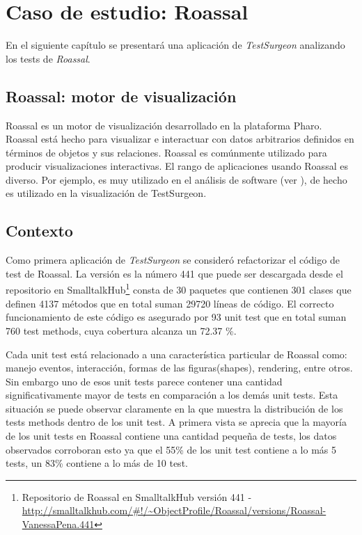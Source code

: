 \chapter{Caso de estudio: Roassal}

\par En el siguiente capítulo se presentará una aplicación de \emph{TestSurgeon} analizando los tests de \emph{Roassal}. 

\section{Roassal: motor de visualización}

\par Roassal es un motor de visualización desarrollado en la plataforma Pharo. Roassal está hecho para visualizar e interactuar con datos arbitrarios definidos en términos de objetos y sus relaciones. Roassal es comúnmente utilizado para producir visualizaciones interactivas. El rango de aplicaciones usando Roassal es diverso. Por ejemplo, es muy utilizado en el análisis de software (ver ), de hecho es utilizado en la visualización de TestSurgeon.


\section{Contexto}

\par Como primera aplicación de \emph{TestSurgeon} se consideró refactorizar el código de test de Roassal. La versión es la número 441 que puede ser descargada desde el repositorio en SmalltalkHub\footnote{Repositorio de Roassal en SmalltalkHub versión 441 - \url{http://smalltalkhub.com/#!/~ObjectProfile/Roassal/versions/Roassal-VanessaPena.441} } consta de 30 paquetes que contienen 301 clases que definen 4137 métodos que en total suman 29720 líneas de código. El correcto funcionamiento de este código es asegurado por 93 unit test que en total suman 760 test methods, cuya cobertura alcanza un 72.37 \%. 

\par Cada unit test está relacionado a una característica particular de Roassal como: manejo eventos, interacción, formas de las figuras(shapes), rendering, entre otros. Sin embargo uno de esos unit tests parece contener una cantidad significativamente mayor de tests en comparación a los demás unit tests. Esta situación se puede observar claramente en la  que muestra la distribución de los tests methods dentro de los unit test. A primera vista se aprecia que la mayoría de los unit tests en Roassal contiene una cantidad pequeña de tests, los datos observados corroboran esto ya que el 55\% de los unit test contiene a lo más 5 tests, un 83\% contiene a lo más de 10 test. 

